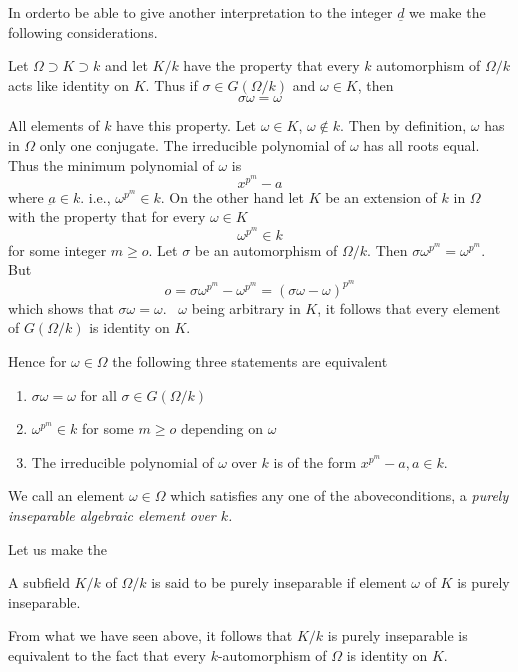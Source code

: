 In order\pageoriginale to be able to give another interpretation to
the integer $\underline{d}$ we make the following considerations.  

Let $\Omega \supset K \supset k$ and let $K/k$ have the property that
every $k$ automorphism of $\Omega/k$ acts like identity on $K$. Thus
if $\sigma \in G(\Omega/k)$ and $\omega \in K$, then  
$$
\sigma \omega = \omega
$$

All elements of $k$ have this property. Let $\omega \in K$, $\omega
\notin k$. Then by definition, $\omega$ has in $\Omega$ only one
conjugate. The irreducible polynomial of $\omega$ has all roots
equal. Thus the minimum polynomial of $\omega$ is  
$$
x^{p^m} - a
$$
where $\underbar{a} \in k$. i.e., $\omega^{p^m} \in k$. On the other
hand let $K$ be an extension of $k$ in $\Omega$ with the property that
for every $\omega \in K$ 
$$
\omega^{p^m} \in k
$$
for some integer $m \geq o$. Let $\sigma$ be an automorphism of
$\Omega/k$. Then $\sigma \omega^{p^m} = \omega^{p^m}$. But  
$$
o = \sigma \omega^{p^m} - \omega^{p^m} = (\sigma \omega - \omega )^{p^m}
$$
which shows that $\sigma \omega = \omega$. \, $\omega$ being arbitrary in
$K$, it follows that every element of $G(\Omega /k )$ is identity on
$K$.  

Hence for $\omega \in \Omega$ the following three statements are
equivalent  
\begin{enumerate}[1)]
\item $\sigma \omega = \omega$ for all $\sigma \in G(\Omega /k)$
\item $\omega^{p^m} \in k$ for some $m \geq o$ depending on $\omega$ 
\item The irreducible polynomial of $\omega$ over $k$ is of the form
  $x^{p^m} - a, a \in k$. 
\end{enumerate}

We call an element $\omega \in \Omega$ which satisfies any one of the
above\pageoriginale conditions, a \textit{purely inseparable algebraic
  element over   $k$.}  
 
Let us make the 

\begin{defi*}%
 A subfield $ K /k$ of $\Omega /k$  is said to be purely
  inseparable if element $\omega$ of $K$ is purely inseparable.
\end{defi*}

From what we have seen above, it follows that $K /k$ is purely
inseparable is equivalent to the fact that every $k$-automorphism of 
$\Omega$ is identity on $K$.  


